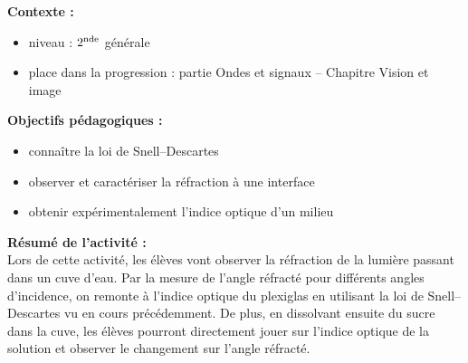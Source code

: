 \documentclass[a4paper,11pt]{article} %
\newenvironment{encart}[1]{%
	\begin{tcolorbox}
		[
		breakable, enhanced jigsaw, %
		arc = 1mm, %
		title = \textbf{#1}, %
		coltitle = white, %
		colbacktitle = blue, %
		colback = white, %
		colframe = blue %
		]
}{		
	\end{tcolorbox}
}
\begin{document}
	
	\begin{encart}{Activité pédagogique 2 : réfraction à une interface -- Loi de Snell-Descartes}
		\textbf{Contexte :}
		\begin{itemize}
			\item niveau : $ 2^\textup{nde} $ générale
			\item place dans la progression : partie Ondes et signaux -- Chapitre Vision et image
		\end{itemize}
		\vspace{0.5cm}
		
		\textbf{Objectifs pédagogiques :}
		\begin{itemize}
			\item connaître la loi de Snell--Descartes
			\item observer et caractériser la réfraction à une interface
			\item obtenir expérimentalement l'indice optique d'un milieu
		\end{itemize}
		\vspace{0.5cm}
		
		\textbf{Résumé de l'activité :}\\
		Lors de cette activité, les élèves vont observer la réfraction de la lumière passant dans un cuve d'eau. Par la mesure de l'angle réfracté pour différents angles d'incidence, on remonte à l'indice optique du plexiglas en utilisant la loi de Snell--Descartes vu en cours précédemment. De plus, en dissolvant ensuite du sucre dans la cuve, les élèves pourront directement jouer sur l'indice optique de la solution et observer le changement sur l'angle réfracté.\\
		

\end{encart}
\end{document}
